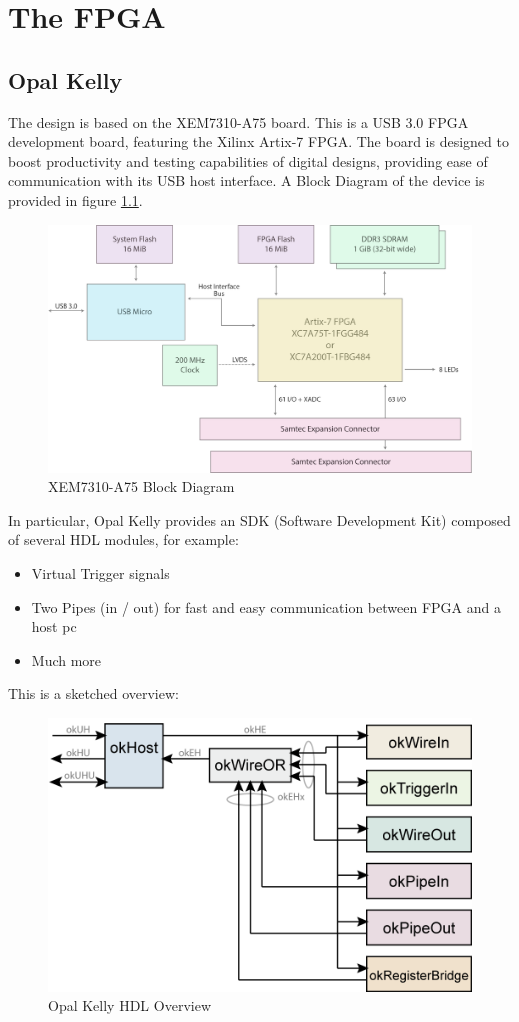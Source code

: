 \chapter{The FPGA}
\label{cha:fpga}

\section{Opal Kelly}
\label{sec:fpga-opal}
The design is based on the XEM7310-A75 board. This is a USB 3.0 FPGA development board, featuring the Xilinx Artix-7 FPGA. The board is designed to boost productivity and testing capabilities of digital designs, providing ease of communication with its USB host interface. A Block Diagram of the device is provided in figure \ref{fig:xem-block-diagram}.
\begin{figure}
    \centering
    \includegraphics[width=0.5\linewidth]{lt_bachelor_disi_en//images/2XEM7310-BlockDiagram.png}
    \caption{XEM7310-A75 Block Diagram}
    \label{fig:xem-block-diagram}
\end{figure}

In particular, Opal Kelly provides an SDK (Software Development Kit) composed of several HDL modules, for example:
\begin{itemize}
    \item Virtual Trigger signals
    \item Two Pipes (in / out) for fast and easy communication between FPGA and a host pc
    \item Much more
\end{itemize}
This is a sketched overview:
\begin{figure}
    \centering
    \includegraphics[width=0.5\linewidth]{lt_bachelor_disi_en//images/FrontPanelHDL-USB3.png}
    \caption{Opal Kelly HDL Overview}
    \label{fig:opal-kelly-hdl}
\end{figure}


